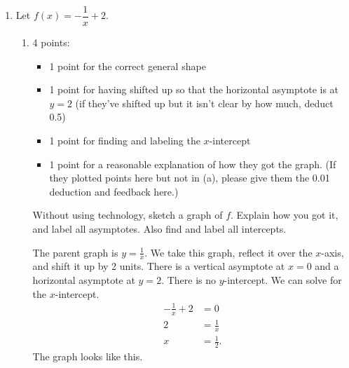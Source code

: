 \documentclass{article}
\begin{document}
\begin{enumerate}
\begin{enumerate}
  \item
    Let $f(x) = - \dfrac{1}{x} + 2$.

    \begin{enumerate}
    \item

      \begin{grading}
        4 points:
        \begin{itemize}[nosep]
        \item 1 point for the correct general shape
        \item 1 point for having shifted up so that the horizontal asymptote is at $y = 2$ (if they've shifted up but it isn't clear by how much, deduct 0.5)
        \item 1 point for finding and labeling the $x$-intercept
        \item 1 point for a reasonable explanation of how they got the graph. (If they plotted points here but not in (a), please give them the 0.01 deduction and feedback here.) 
        \end{itemize}
      \end{grading}

      \begin{problem}[\stretch{3}]
        Without using technology, sketch a graph of $f$. Explain how you got it, and label all asymptotes. Also find and label all intercepts. 
      \end{problem}

      \begin{solution}
        The parent graph is $y=\frac{1}{x}$. We take this graph, reflect it over the
        $x$-axis, and shift it up by 2 units. There is a vertical asymptote at $x=0$
        and a horizontal asymptote at $y=2$. There is no $y$-intercept.
        We can solve for the $x$-intercept.
        \begin{align*}
          -\frac{1}{x}+2 &= 0 \\
          2 &= \frac{1}{x} \\
          x &= \frac{1}{2}.
        \end{align*}
        The graph looks like this.
         \begin{center}
        \end{center}
      \end{solution}


\end{enumerate}
\end{enumerate}
\end{enumerate}
\end{document}
